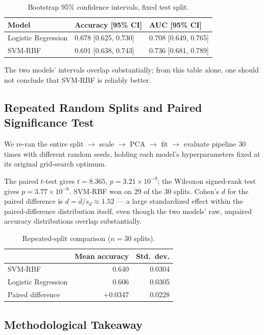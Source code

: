 \documentclass[11pt]{article}
\begin{document}
\begin{table}[htbp]
\centering
\caption{Bootstrap 95\% confidence intervals, fixed test split.}
\label{tab:bootstrap}
\begin{tabular}{lll}
\toprule
Model & Accuracy [95\% CI] & AUC [95\% CI] \\
\midrule
Logistic Regression & 0.678 [0.625, 0.730] & 0.708 [0.649, 0.765] \\
SVM-RBF & 0.691 [0.638, 0.743] & 0.736 [0.681, 0.789] \\
\bottomrule
\end{tabular}
\end{table}

The two models' intervals overlap substantially; from this table alone, one should not conclude that SVM-RBF is reliably better.

\subsection{Repeated Random Splits and Paired Significance Test}

We re-ran the entire split $\to$ scale $\to$ PCA $\to$ fit $\to$ evaluate pipeline 30 times with different random seeds, holding each model's hyperparameters fixed at its original grid-search optimum.

The paired $t$-test gives $t = 8.365$, $p = 3.21\times10^{-9}$; the Wilcoxon signed-rank test gives $p = 3.77\times10^{-6}$. SVM-RBF won on 29 of the 30 splits. Cohen's $d$ for the paired difference is $d = \bar d / s_d \approx 1.52$ --- a large standardized effect within the paired-difference distribution itself, even though the two models' raw, unpaired accuracy distributions overlap substantially.

\begin{table}[htbp]
\centering
\caption{Repeated-split comparison ($n=30$ splits).}
\label{tab:repeated}
\begin{tabular}{lrr}
\toprule
 & Mean accuracy & Std.\ dev. \\
\midrule
SVM-RBF & 0.640 & 0.0304 \\
Logistic Regression & 0.606 & 0.0305 \\
Paired difference & +0.0347 & 0.0228 \\
\bottomrule
\end{tabular}
\end{table}

\subsection{Methodological Takeaway}
\end{document}
